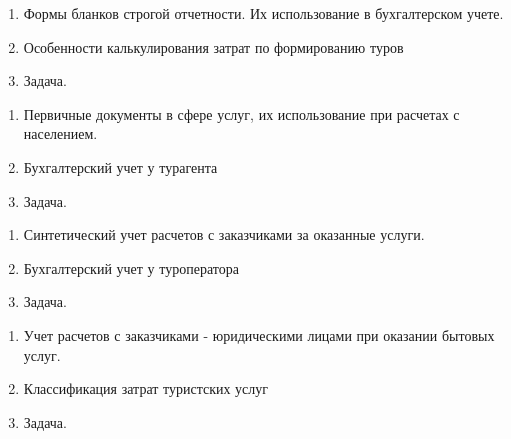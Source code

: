 \newpage


\shapkFull
\setcounter{zad}{0}

\begin{enumerate}
	\item Формы бланков строгой отчетности. Их использование в бухгалтерском учете.

	\item Особенности калькулирования затрат по формированию туров

	\item Задача.
\end{enumerate}

\newpage


\shapkFull
\setcounter{zad}{0}

\begin{enumerate}
	\item Первичные документы в сфере услуг, их использование при расчетах с населением.

	\item Бухгалтерский учет у турагента

	\item Задача.
\end{enumerate}

\newpage


\shapkFull
\setcounter{zad}{0}

\begin{enumerate}
	\item Синтетический учет расчетов с заказчиками за оказанные услуги.

	\item Бухгалтерский учет у туроператора

	\item Задача.
\end{enumerate}

\newpage


\shapkFull
\setcounter{zad}{0}

\begin{enumerate}
	\item Учет расчетов с заказчиками - юридическими лицами при оказании бытовых услуг.

	\item Классификация затрат туристских услуг

	\item Задача.
\end{enumerate}

